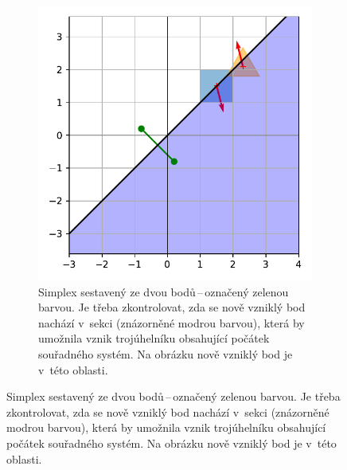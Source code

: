 \begin{figure}
\begin{subfigure}[t]{0.45\textwidth}
         \centering
    \includegraphics[scale=0.5]{obrazky-figures/gjk/gjk_line_2.pdf}
    \caption{Simplex sestavený ze dvou bodů\,--\,označený zelenou barvou. Je třeba zkontrolovat, zda se nově vzniklý bod nachází v~sekci (znázorněné modrou barvou), která by umožnila vznik trojúhelníku obsahující počátek souřadného systém. Na obrázku nově vzniklý bod je v~této oblasti.}
    \label{fig:gjk_line_cols}
    

\end{subfigure}
\end{figure}
